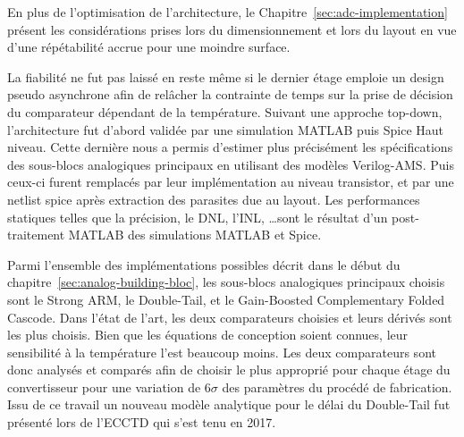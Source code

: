 \begin{mdframed}[linecolor=Prune,linewidth=1]
En plus de l'optimisation de l'architecture, le Chapitre~\ref{sec:adc-implementation} présent les considérations prises lors du dimensionnement et lors du layout en vue d'une répétabilité accrue pour une moindre surface.

La fiabilité ne fut pas laissé en reste même si le dernier étage emploie un design pseudo asynchrone afin de relâcher la contrainte de temps sur la prise de décision du comparateur dépendant de la température. Suivant une approche top-down, l'architecture fut d'abord validée par une simulation MATLAB puis Spice Haut niveau. Cette dernière nous a permis d'estimer plus précisément les spécifications des sous-blocs analogiques principaux en utilisant des modèles Verilog-AMS\@. Puis ceux-ci furent remplacés par leur implémentation au niveau transistor, et par une netlist spice après extraction des parasites due au layout. Les performances statiques telles que la précision, le DNL, l'INL, \ldots sont le résultat d'un post-traitement MATLAB des simulations MATLAB et Spice.

Parmi l'ensemble des implémentations possibles décrit dans le début du chapitre~\ref{sec:analog-building-bloc}, les sous-blocs analogiques principaux choisis sont le Strong ARM, le Double-Tail, et le Gain-Boosted Complementary Folded Cascode. Dans l'état de l'art, les deux comparateurs choisies et leurs dérivés sont les plus choisis. Bien que les équations de conception soient connues, leur sensibilité à la température l'est beaucoup moins. Les deux comparateurs sont donc analysés et comparés afin de choisir le plus approprié pour chaque étage du convertisseur pour une variation de 6$\sigma$ des paramètres du procédé de fabrication. Issu de ce travail un nouveau modèle analytique pour le délai du Double-Tail fut présenté lors de l'ECCTD qui s'est tenu en 2017.


\end{mdframed}
